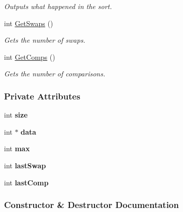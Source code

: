 \begin{DoxyCompactItemize}
\begin{DoxyCompactList}\small\item\em Outputs what happened in the sort. \end{DoxyCompactList}\item 
int \hyperlink{class_counting_sort_adcce24a59aa35e8c05f56cf529963e11}{Get\+Swaps} ()
\begin{DoxyCompactList}\small\item\em Gets the number of swaps. \end{DoxyCompactList}\item 
int \hyperlink{class_counting_sort_aaec9b4404803b770fdf2b02235dfa22e}{Get\+Comps} ()
\begin{DoxyCompactList}\small\item\em Gets the number of comparisons. \end{DoxyCompactList}\end{DoxyCompactItemize}
\subsubsection*{Private Attributes}
\begin{DoxyCompactItemize}
\item 
int {\bfseries size}\hypertarget{class_counting_sort_a943cf202f3731d81c97035a4ab989820}{}\label{class_counting_sort_a943cf202f3731d81c97035a4ab989820}

\item 
int $\ast$ {\bfseries data}\hypertarget{class_counting_sort_a7ed190ada052d8133142d5735c2f0ec4}{}\label{class_counting_sort_a7ed190ada052d8133142d5735c2f0ec4}

\item 
int {\bfseries max}\hypertarget{class_counting_sort_a3bb9f07597f2d6dad14557d61160221a}{}\label{class_counting_sort_a3bb9f07597f2d6dad14557d61160221a}

\item 
int {\bfseries last\+Swap}\hypertarget{class_counting_sort_af372a8521db8f01a73f693b4bb387af7}{}\label{class_counting_sort_af372a8521db8f01a73f693b4bb387af7}

\item 
int {\bfseries last\+Comp}\hypertarget{class_counting_sort_aae122091fbf6b4f8b42610cdb883f3aa}{}\label{class_counting_sort_aae122091fbf6b4f8b42610cdb883f3aa}

\end{DoxyCompactItemize}


\subsubsection{Constructor \& Destructor Documentation}
